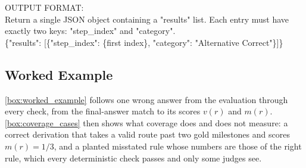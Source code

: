 \begin{tcolorbox}[
    colback=gray!5,
    colframe=gray!40,
    boxrule=0.4pt,
    arc=2pt,
    left=6pt,
    right=6pt,
    top=6pt,
    bottom=6pt,
    breakable
]
OUTPUT FORMAT: \\
Return a single JSON object containing a "results" list. Each entry must have exactly two keys:
"step\_index" and "category". \\
\{"results": [\{"step\_index": \{first index\}, "category": "Alternative Correct"\}]\}
\end{tcolorbox}

\subsection{Worked Example}

\autoref{box:worked_example} follows one wrong answer from the evaluation through every check, from
the final-answer match to its scores $v(r)$ and $m(r)$.
\autoref{box:coverage_cases} then shows what coverage does and does not measure: a correct
derivation that takes a valid route past two gold milestones and scores $m(r) = 1/3$, and a
planted misstated rule whose numbers are those of the right rule, which every deterministic check
passes and only some judges see.



